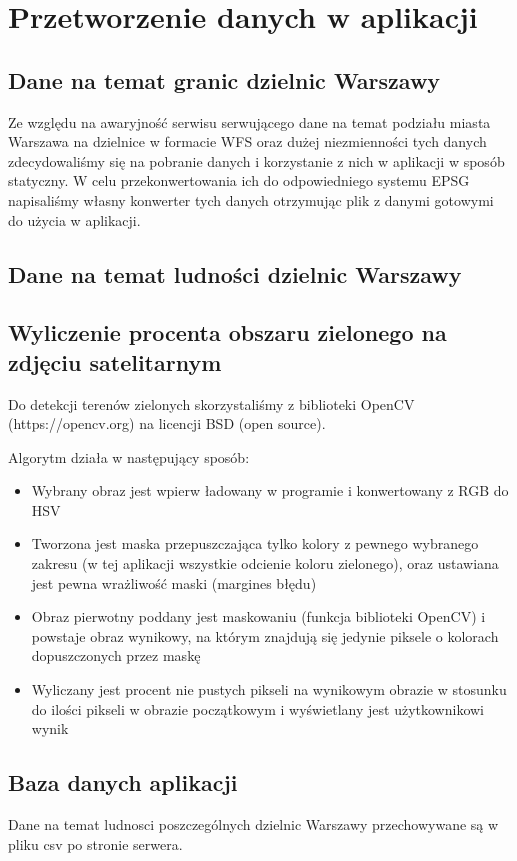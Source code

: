\documentclass[11pt]{article}
\begin{document}
	\section{Przetworzenie danych w aplikacji}

	\subsection{Dane na temat granic dzielnic Warszawy}
	Ze względu na awaryjność serwisu serwującego dane na temat podziału miasta Warszawa na dzielnice w formacie WFS oraz dużej niezmienności tych danych zdecydowaliśmy się na pobranie danych i korzystanie z nich w aplikacji w sposób statyczny. W celu przekonwertowania ich do odpowiedniego systemu EPSG napisaliśmy własny konwerter tych danych otrzymując plik z danymi gotowymi do użycia w aplikacji.

	\subsection{Dane na temat ludności dzielnic Warszawy}


	\subsection{Wyliczenie procenta obszaru zielonego na zdjęciu satelitarnym}
	Do detekcji terenów zielonych skorzystaliśmy z biblioteki OpenCV (https://opencv.org) na licencji BSD (open source). 

	Algorytm działa w następujący sposób:
	\begin{itemize}
	\item Wybrany obraz jest wpierw ładowany w programie i konwertowany z RGB do HSV
	\item Tworzona jest maska przepuszczająca tylko kolory z pewnego wybranego zakresu (w tej aplikacji wszystkie odcienie koloru zielonego), oraz ustawiana jest pewna wrażliwość maski (margines błędu)
	\item Obraz pierwotny poddany jest maskowaniu (funkcja biblioteki OpenCV) i powstaje obraz wynikowy, na którym znajdują się jedynie piksele o kolorach dopuszczonych przez maskę
	\item Wyliczany jest procent nie pustych pikseli na wynikowym obrazie w stosunku do ilości pikseli w obrazie początkowym i wyświetlany jest użytkownikowi wynik
	\end{itemize}



	\subsection{Baza danych aplikacji}
	Dane na temat ludnosci poszczególnych dzielnic Warszawy przechowywane są w pliku csv po stronie serwera.
\end{document}
